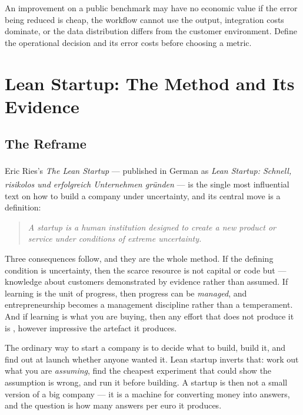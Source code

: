 \begin{cautionbox}
An improvement on a public benchmark may have no economic value if the error
being reduced is cheap, the workflow cannot use the output, integration costs
dominate, or the data distribution differs from the customer environment.
Define the operational decision and its error costs before choosing a metric.
\end{cautionbox}

\section{Lean Startup: The Method and Its Evidence}
\label{sec:startup-lean}

\subsection{The Reframe}

Eric Ries's \emph{The Lean
Startup}\textsuperscript{\cite{riesLeanStartup2011}} --- published in German
as \emph{Lean Startup: Schnell, risikolos und erfolgreich Unternehmen
gründen}\textsuperscript{\cite{riesLeanStartupDeutsch2014}} --- is the single
most influential text on how to build a company under uncertainty, and its
central move is a definition:

\begin{quote}
\itshape A startup is a human institution designed to create a new product or
service under conditions of extreme uncertainty.
\end{quote}

Three consequences follow, and they are the whole method. If the defining
condition is uncertainty, then the scarce resource is not capital or code but
 --- knowledge about customers demonstrated by
evidence rather than assumed. If learning is the unit of progress, then
progress can be \emph{managed}, and entrepreneurship becomes a management
discipline rather than a temperament. And if learning is what you are buying,
then any effort that does not produce it is , however
impressive the artefact it produces.

\begin{plainlanguage}
The ordinary way to start a company is to decide what to build, build it, and
find out at launch whether anyone wanted it. Lean startup inverts that: work
out what you are \emph{assuming}, find the cheapest experiment that could show
the assumption is wrong, and run it before building. A startup is then not a
small version of a big company --- it is a machine for converting money into
answers, and the question is how many answers per euro it produces.
\end{plainlanguage}

